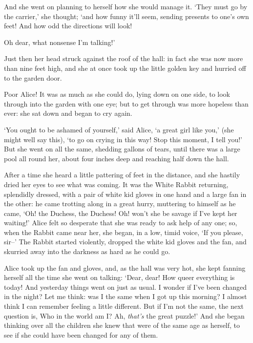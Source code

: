   And she went on planning to herself how she would manage it.
`They must go by the carrier,' she thought; `and how funny it'll
seem, sending presents to one's own feet!  And how odd the
directions will look!

\onelineskip
{}
\onelineskip
Oh dear, what nonsense I'm talking!'

  Just then her head struck against the roof of the hall:  in
fact she was now more than nine feet high, and she at once took
up the little golden key and hurried off to the garden door.

  Poor Alice!  It was as much as she could do, lying down on one
side, to look through into the garden with one eye; but to get
through was more hopeless than ever:  she sat down and began to
cry again.

  `You ought to be ashamed of yourself,' said Alice, `a great
girl like you,' (she might well say this), `to go on crying in
this way!  Stop this moment, I tell you!'  But she went on all
the same, shedding gallons of tears, until there was a large pool
all round her, about four inches deep and reaching half down the
hall.

  After a time she heard a little pattering of feet in the
distance, and she hastily dried her eyes to see what was coming.
It was the White Rabbit returning, splendidly dressed, with a
pair of white kid gloves in one hand and a large fan in the
other:  he came trotting along in a great hurry, muttering to
himself as he came, `Oh! the Duchess, the Duchess! Oh! won't she
be savage if I've kept her waiting!'  Alice felt so desperate
that she was ready to ask help of any one; so, when the Rabbit
came near her, she began, in a low, timid voice, `If you please,
sir--'  The Rabbit started violently, dropped the white kid
gloves and the fan, and skurried away into the darkness as hard
as he could go.

  Alice took up the fan and gloves, and, as the hall was very
hot, she kept fanning herself all the time she went on talking:
`Dear, dear!  How queer everything is today!  And yesterday
things went on just as usual.  I wonder if I've been changed in
the night?  Let me think:  was I the same when I got up this
morning?  I almost think I can remember feeling a little
different.  But if I'm not the same, the next question is, Who in
the world am I?  Ah, {\it that's} the great puzzle!'  And she began
thinking over all the children she knew that were of the same age
as herself, to see if she could have been changed for any of
them.

